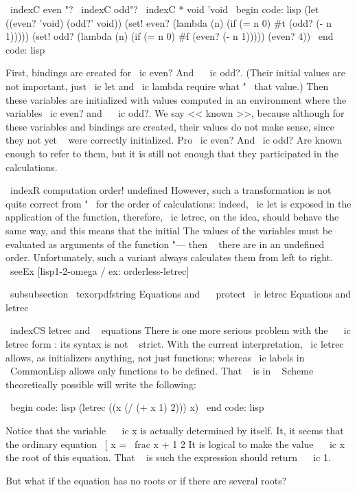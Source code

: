 {\ indexC {even "?} \ indexC {odd"?} \ indexC * {void} {'void}
\ begin {code: lisp}
(let ((even? 'void) (odd?' void))
  (set! even? (lambda (n) (if (= n 0) #t (odd? (- n 1)))))
  (set! odd? (lambda (n) (if (= n 0) #f (even? (- n 1)))))
  (even? 4))
\ end {code: lisp}

First, bindings are created for \ ic {even?} And ~ \ ic {odd?}. (Their initial values
are not important, just \ ic {let} and \ ic {lambda} require what "~ that value.) Then these
variables are initialized with values ​​computed in an environment where the
variables \ ic {even?} and ~ \ ic {odd?}. We say << known >>, because although for
these variables and bindings are created, their values ​​do not make sense, since they
not yet ~ were correctly initialized. Pro \ ic {even?} And \ ic {odd?} Are known
enough to refer to them, but it is still not enough that they
participated in the calculations.

\ indexR {computation order! undefined}
However, such a transformation is not quite correct from "~ for the order of calculations:
indeed, \ ic {let} is exposed in the application of the function, therefore,
\ ic {letrec}, on the idea, should behave the same way, and this means that the initial
The values ​​of the variables must be evaluated as arguments of the function "--- then ~ there are
in an undefined order. Unfortunately, such a variant always calculates them
from left to right. \ seeEx [lisp1-2-omega / ex: orderless-letrec]


\ subsubsection { \ texorpdfstring {Equations and ~ \ protect \ ic {letrec}} %
{Equations and letrec}}

\ indexCS { letrec } {and ~ equations}
There is one more serious problem with the ~ \ ic {letrec} form : its syntax is not ~
strict. With the current interpretation, \ ic {letrec} allows, as initializers
anything, not just functions; whereas \ ic {labels} in ~ { \ CommonLisp }
allows only functions to be defined. That ~ is in ~ Scheme theoretically possible
will write the following:

\ begin {code: lisp}
(letrec ((x (/ (+ x 1) 2))) x)
\ end {code: lisp}

Notice that the variable ~ \ ic {x} is actually determined by itself. It,
it seems that the ordinary equation
%
\ [   x = \ frac {x + 1} {2}   \]
%
It is logical to make the value ~ \ ic {x} the root of this equation. That ~ is such
the expression should return ~ \ ic {1}.

But what if the equation has no roots or if there are several roots?

}
